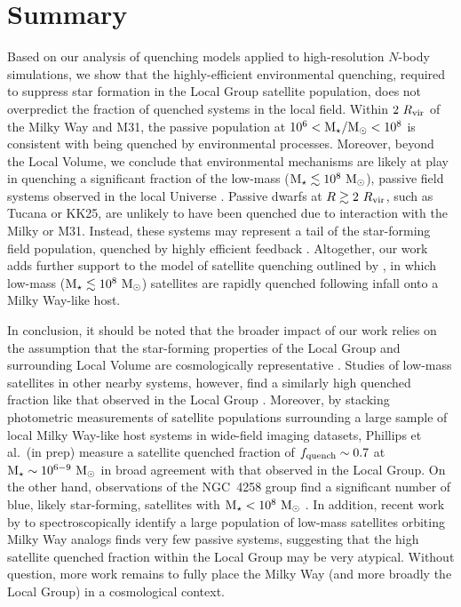 \section{Summary}
\label{sec:endgame}

Based on our analysis of quenching models applied to high-resolution $N$-body
simulations, we show that the highly-efficient environmental quenching, required
to suppress star formation in the Local Group satellite population, does not
overpredict the fraction of quenched systems in the local field. Within
$2~R_{\rm{vir}}$ of the Milky Way and M31, the passive population at
$10^{6} < {\rm M}_{\star}/{\rm M}_{\odot} < 10^{8}$ is consistent with being quenched by
environmental processes.
%
Moreover, beyond the Local Volume, we conclude that environmental mechanisms are
likely at play in quenching a significant fraction of the low-mass
(${\rm M}_{\star} \lesssim 10^{8}~{\rm M}_{\odot}$), passive field systems observed in the local
Universe \citep[see also][]{simpson18}.
%
Passive dwarfs at $R \gtrsim 2~R_{\rm{vir}}$, such as Tucana or KK25, are unlikely to
have been quenched due to interaction with the Milky or M31. Instead, these
systems may represent a tail of the star-forming field population, quenched by
highly efficient feedback \citep[e.g.][]{nihao1, dicintio17, fitts17}.
%
Altogether, our work adds further support to the model of satellite quenching
outlined by \citet{fham15, fham16}, in which low-mass
(${\rm M}_{\star} \lesssim 10^{8}~{\rm M}_{\odot}$) satellites are rapidly quenched following
infall onto a Milky Way-like host.
%


In conclusion, it should be noted that the broader impact of our work relies on
the assumption that the star-forming properties of the Local Group and
surrounding Local Volume are cosmologically representative \citep[i.e.~are not
atypical,][]{bk16}. 
%
Studies of low-mass satellites in other nearby systems, however, find a
similarly high quenched fraction like that observed in the Local Group
\citep[e.g.][]{kaisin13}. 
%
Moreover, by stacking photometric measurements of satellite
populations surrounding a large sample of local Milky Way-like host
systems in wide-field imaging datasets, Phillips et al.~(in prep)
measure a satellite quenched fraction of $f_{\rm quench} \sim 0.7$ at
${\rm M}_{\star} \sim 10^{6-9}~{\rm M}_{\odot}$ in broad agreement with that observed in
the Local Group. 
%
On the other hand, observations of the NGC~4258 group find a significant number
of blue, likely star-forming, satellites with ${\rm M}_{\star} < 10^{8}~{\rm M}_{\odot}$
\citep{spencer14}. In addition, recent work by \citet{geha17} to
spectroscopically identify a large population of low-mass satellites orbiting
Milky Way analogs finds very few passive systems, suggesting that the high
satellite quenched fraction within the Local Group may be very atypical. Without
question, more work remains to fully place the Milky Way (and more broadly the
Local Group) in a cosmological context.


